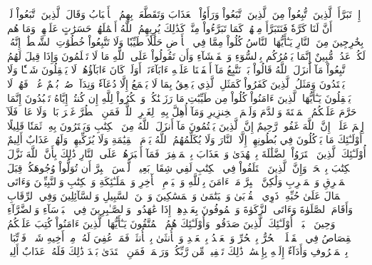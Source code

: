 إِذۡ تَبَرَّأَ ٱلَّذِينَ ٱتُّبِعُواْ مِنَ ٱلَّذِينَ ٱتَّبَعُواْ وَرَأَوُاْ ٱلۡعَذَابَ وَتَقَطَّعَتۡ بِهِمُ ٱلۡأَسۡبَابُ
وَقَالَ ٱلَّذِينَ ٱتَّبَعُواْ لَوۡ أَنَّ لَنَا كَرَّةٗ فَنَتَبَرَّأَ مِنۡهُمۡ كَمَا تَبَرَّءُواْ مِنَّاۗ كَذَٰلِكَ يُرِيهِمُ ٱللَّهُ أَعۡمَٰلَهُمۡ حَسَرَٰتٍ عَلَيۡهِمۡۖ وَمَا هُم بِخَٰرِجِينَ مِنَ ٱلنَّارِ
يَـٰٓأَيُّهَا ٱلنَّاسُ كُلُواْ مِمَّا فِي ٱلۡأَرۡضِ حَلَٰلٗا طَيِّبٗا وَلَا تَتَّبِعُواْ خُطُوَٰتِ ٱلشَّيۡطَٰنِۚ إِنَّهُۥ لَكُمۡ عَدُوّٞ مُّبِينٌ
إِنَّمَا يَأۡمُرُكُم بِٱلسُّوٓءِ وَٱلۡفَحۡشَآءِ وَأَن تَقُولُواْ عَلَى ٱللَّهِ مَا لَا تَعۡلَمُونَ
وَإِذَا قِيلَ لَهُمُ ٱتَّبِعُواْ مَآ أَنزَلَ ٱللَّهُ قَالُواْ بَلۡ نَتَّبِعُ مَآ أَلۡفَيۡنَا عَلَيۡهِ ءَابَآءَنَآۚ أَوَلَوۡ كَانَ ءَابَآؤُهُمۡ لَا يَعۡقِلُونَ شَيۡـٔٗا وَلَا يَهۡتَدُونَ
وَمَثَلُ ٱلَّذِينَ كَفَرُواْ كَمَثَلِ ٱلَّذِي يَنۡعِقُ بِمَا لَا يَسۡمَعُ إِلَّا دُعَآءٗ وَنِدَآءٗۚ صُمُّۢ بُكۡمٌ عُمۡيٞ فَهُمۡ لَا يَعۡقِلُونَ
يَـٰٓأَيُّهَا ٱلَّذِينَ ءَامَنُواْ كُلُواْ مِن طَيِّبَٰتِ مَا رَزَقۡنَٰكُمۡ وَٱشۡكُرُواْ لِلَّهِ إِن كُنتُمۡ إِيَّاهُ تَعۡبُدُونَ
إِنَّمَا حَرَّمَ عَلَيۡكُمُ ٱلۡمَيۡتَةَ وَٱلدَّمَ وَلَحۡمَ ٱلۡخِنزِيرِ وَمَآ أُهِلَّ بِهِۦ لِغَيۡرِ ٱللَّهِۖ فَمَنِ ٱضۡطُرَّ غَيۡرَ بَاغٖ وَلَا عَادٖ فَلَآ إِثۡمَ عَلَيۡهِۚ إِنَّ ٱللَّهَ غَفُورٞ رَّحِيمٌ
إِنَّ ٱلَّذِينَ يَكۡتُمُونَ مَآ أَنزَلَ ٱللَّهُ مِنَ ٱلۡكِتَٰبِ وَيَشۡتَرُونَ بِهِۦ ثَمَنٗا قَلِيلًا أُوْلَـٰٓئِكَ مَا يَأۡكُلُونَ فِي بُطُونِهِمۡ إِلَّا ٱلنَّارَ وَلَا يُكَلِّمُهُمُ ٱللَّهُ يَوۡمَ ٱلۡقِيَٰمَةِ وَلَا يُزَكِّيهِمۡ وَلَهُمۡ عَذَابٌ أَلِيمٌ
أُوْلَـٰٓئِكَ ٱلَّذِينَ ٱشۡتَرَوُاْ ٱلضَّلَٰلَةَ بِٱلۡهُدَىٰ وَٱلۡعَذَابَ بِٱلۡمَغۡفِرَةِۚ فَمَآ أَصۡبَرَهُمۡ عَلَى ٱلنَّارِ
ذَٰلِكَ بِأَنَّ ٱللَّهَ نَزَّلَ ٱلۡكِتَٰبَ بِٱلۡحَقِّۗ وَإِنَّ ٱلَّذِينَ ٱخۡتَلَفُواْ فِي ٱلۡكِتَٰبِ لَفِي شِقَاقِۭ بَعِيدٖ
۞لَّيۡسَ ٱلۡبِرَّ أَن تُوَلُّواْ وُجُوهَكُمۡ قِبَلَ ٱلۡمَشۡرِقِ وَٱلۡمَغۡرِبِ وَلَٰكِنَّ ٱلۡبِرَّ مَنۡ ءَامَنَ بِٱللَّهِ وَٱلۡيَوۡمِ ٱلۡأٓخِرِ وَٱلۡمَلَـٰٓئِكَةِ وَٱلۡكِتَٰبِ وَٱلنَّبِيِّـۧنَ وَءَاتَى ٱلۡمَالَ عَلَىٰ حُبِّهِۦ ذَوِي ٱلۡقُرۡبَىٰ وَٱلۡيَتَٰمَىٰ وَٱلۡمَسَٰكِينَ وَٱبۡنَ ٱلسَّبِيلِ وَٱلسَّآئِلِينَ وَفِي ٱلرِّقَابِ وَأَقَامَ ٱلصَّلَوٰةَ وَءَاتَى ٱلزَّكَوٰةَ وَٱلۡمُوفُونَ بِعَهۡدِهِمۡ إِذَا عَٰهَدُواْۖ وَٱلصَّـٰبِرِينَ فِي ٱلۡبَأۡسَآءِ وَٱلضَّرَّآءِ وَحِينَ ٱلۡبَأۡسِۗ أُوْلَـٰٓئِكَ ٱلَّذِينَ صَدَقُواْۖ وَأُوْلَـٰٓئِكَ هُمُ ٱلۡمُتَّقُونَ
يَـٰٓأَيُّهَا ٱلَّذِينَ ءَامَنُواْ كُتِبَ عَلَيۡكُمُ ٱلۡقِصَاصُ فِي ٱلۡقَتۡلَىۖ ٱلۡحُرُّ بِٱلۡحُرِّ وَٱلۡعَبۡدُ بِٱلۡعَبۡدِ وَٱلۡأُنثَىٰ بِٱلۡأُنثَىٰۚ فَمَنۡ عُفِيَ لَهُۥ مِنۡ أَخِيهِ شَيۡءٞ فَٱتِّبَاعُۢ بِٱلۡمَعۡرُوفِ وَأَدَآءٌ إِلَيۡهِ بِإِحۡسَٰنٖۗ ذَٰلِكَ تَخۡفِيفٞ مِّن رَّبِّكُمۡ وَرَحۡمَةٞۗ فَمَنِ ٱعۡتَدَىٰ بَعۡدَ ذَٰلِكَ فَلَهُۥ عَذَابٌ أَلِيمٞ
